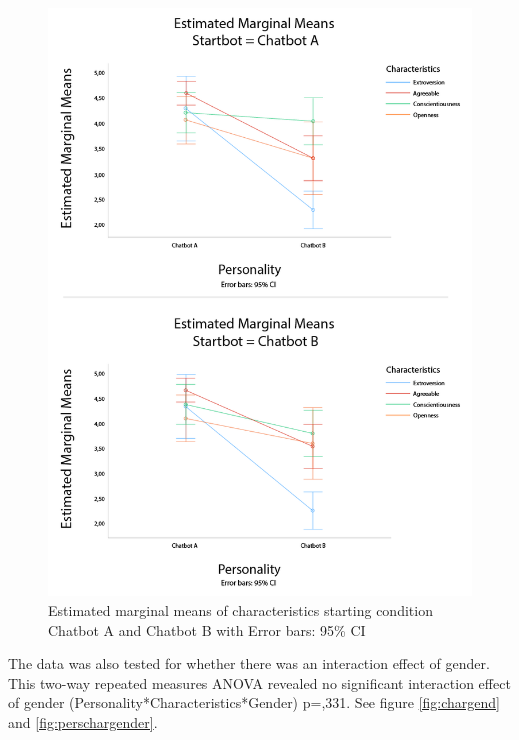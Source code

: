 \begin{figure}
    \centering
    \includegraphics[scale=0.4]{figures/Errorbars_characertistics.png}
    \caption{Estimated marginal means of characteristics starting condition Chatbot A and Chatbot B with Error bars: 95\% CI}
    \label{fig:errorCh}
\end{figure}

The data was also tested for whether there was an interaction effect of gender. This two-way repeated measures ANOVA revealed no significant interaction effect of gender (Personality*Characteristics*Gender) p=,331. See figure \ref{fig:chargend} and \ref{fig:perschargender}.

